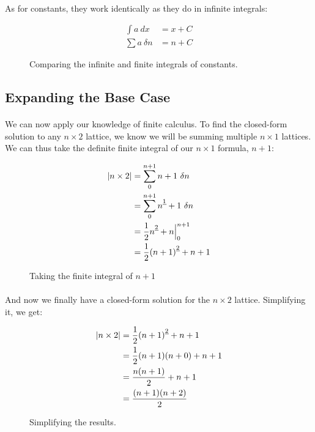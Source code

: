 \documentclass[12pt]{article}
\newcommand{\p}{\paragraph{}}
\newcommand{\fall}[1]{\strut^{\underline{#1}}}
\begin{document}
				\p As for constants, they work identically as they do in infinite integrals:
				
				\begin{figure}[h]
					\begin{align*}
					\int a\ dx &= x + C \\
					\sum a\ \delta n &= n + C
					\end{align*}
					
					\caption{Comparing the infinite and finite integrals of constants.}
				\end{figure}
				
				
		\subsection{Expanding the Base Case}
			
			\p We can now apply our knowledge of finite calculus. To find the closed-form solution to any $n\times2$ lattice, we know we will be summing multiple $n\times1$ lattices. We can thus take the definite finite integral of our $n\times1$ formula, $n+1$:
			
			\begin{figure}[h]
				\begin{align*}
				|n\times2| &= \sum_0^{n+1}n+1\ \delta n \\
				&= \sum_0^{n+1} n\fall{1} + 1\ \delta n \\
				&= \frac{1}{2}n\fall{2} + n \Bigr|_0^{n+1} \\
				&= \frac{1}{2}(n+1)\fall{2} + n + 1
				\end{align*}
				
				\caption{Taking the finite integral of $n+1$}
			\end{figure}
		
			\newpage
			
			
			\p And now we finally have a closed-form solution for the $n\times2$ lattice. Simplifying it, we get:
			
			\begin{figure}[h]
				\begin{align*}
				|n\times2| &= \frac{1}{2}(n+1)\fall{2} + n + 1\\
				&= \frac{1}{2}(n+1)(n+0) + n + 1 \\
				&= \frac{n(n+1)}{2} + n + 1 \\
				&= \frac{(n+1)(n+2)}{2}
				\end{align*}
				
				\caption{Simplifying the results.}
			\end{figure}
			
\end{document}
